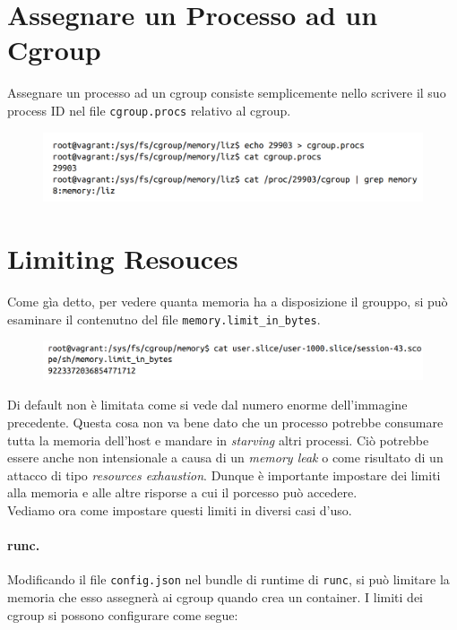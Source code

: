 \section{Assegnare un Processo ad un Cgroup}

Assegnare un processo ad un cgroup consiste semplicemente nello scrivere il suo
process ID nel file \verb|cgroup.procs| relativo al cgroup.

\begin{figure}[H]
    \centering
    \includegraphics[width=\textwidth, keepaspectratio]{capitoli/os_security/imgs/limit4.png}
\end{figure}

\section{Limiting Resouces}

Come gìa detto, per vedere quanta memoria ha a disposizione il grouppo, si può
esaminare il contenutno del file \verb|memory.limit_in_bytes|.

\begin{figure}[H]
    \centering
    \includegraphics[width=\textwidth, keepaspectratio]{capitoli/os_security/imgs/limit1.png}
\end{figure}

Di default non è limitata come si vede dal numero enorme dell'immagine precedente.
Questa cosa non va bene dato che un processo potrebbe consumare tutta la memoria
dell'host e mandare in \textit{starving} altri processi. Ciò potrebbe essere
anche non intensionale a causa di un \textit{memory leak} o come risultato di
un attacco di tipo \textit{resources exhaustion}. Dunque è importante impostare
dei limiti alla memoria e alle altre risporse a cui il porcesso può accedere.\\

Vediamo ora come impostare questi limiti in diversi casi d'uso.

\paragraph{runc.}
Modificando il file \verb|config.json| nel bundle di runtime di \verb|runc|, si può
limitare la memoria che esso assegnerà ai cgroup quando crea un container.
I limiti dei cgroup si possono configurare come segue:

